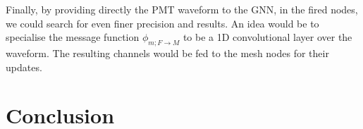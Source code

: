 \documentclass[../main.tex]{subfiles}
\begin{document}
Finally, by providing directly the PMT waveform to the GNN, in the fired nodes, we could search for even finer precision and results. An idea would be to specialise the message function $\phi_{m;F \rightarrow M}$ to be a 1D convolutional layer over the waveform. The resulting channels would be fed to the mesh nodes for their updates.

\section{Conclusion}


%
%
\end{document}
